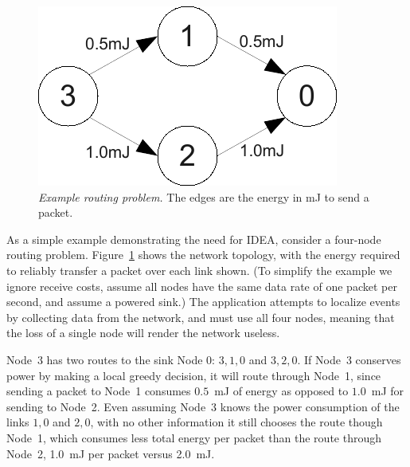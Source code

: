 \documentclass{sig-alternate}
\begin{document}
\begin{figure}[t]
\begin{center}
\includegraphics[width=0.9\hsize]{./figs/MotivationExample.pdf}
\end{center}

\caption{\textit{Example routing problem.} The edges are the energy in
mJ to send a packet.}

\label{fig-motivationexample}
\end{figure}

As a simple example demonstrating the need for IDEA, consider a four-node
routing problem. Figure~\ref{fig-motivationexample} shows the network
topology, with the energy required to reliably transfer a packet over each
link shown. (To simplify the example we ignore receive costs, assume all
nodes have the same data rate of one packet per second, and assume a powered
sink.) The application attempts to localize events by collecting data from
the network, and must use all four nodes, meaning that the loss of a single
node will render the network useless.

Node~3 has two routes to the sink Node 0: $3,1,0$ and $3,2,0$. If Node~3
conserves power by making a local greedy decision, it will route through
Node~1, since sending a packet to Node~1 consumes $0.5$~mJ of energy as
opposed to $1.0$~mJ for sending to Node~2. Even assuming Node~3 knows the
power consumption of the links $1,0$ and $2,0$, with no other information it
still chooses the route though Node~1, which consumes less total energy per
packet than the route through Node~2, 1.0~mJ per packet versus 2.0~mJ.

\vfill\eject
\end{document}
